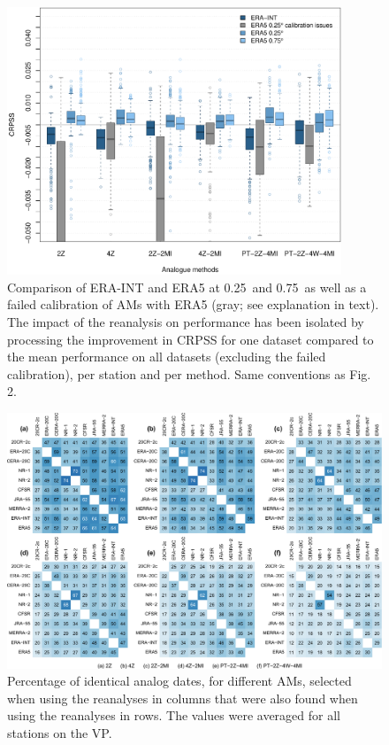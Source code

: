 \documentclass[alpha-refs]{wiley-article}
\begin{document}
\begin{figure}[bt]
	\centering
	\includegraphics[width=100mm]{figures/boxplot-resol-diff.pdf}
	\caption{Comparison of ERA-INT and ERA5 at 0.25\degree\ and 0.75\degree\ as well as a failed calibration of AMs with ERA5 (gray; see explanation in text). The impact of the reanalysis on performance has been isolated by processing the improvement in CRPSS for one dataset compared to the mean performance on all datasets (excluding the failed calibration), per station and per method. Same conventions as Fig. 2.}
	\label{fig:resolution}
\end{figure}

\begin{figure}[bt]
	\centering
	\includegraphics[width=120mm]{figures/similar-dates.pdf}
	\caption{Percentage of identical analog dates, for different AMs, selected when using the reanalyses in columns that were also found when using the reanalyses in rows. The values were averaged for all stations on the VP.}
	\label{fig:shared-dates}
\end{figure}



\end{document}
